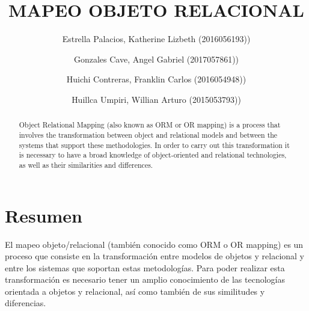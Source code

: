 \documentclass[preprint,12pt]{elsarticle}
\begin{document}
	
	\begin{frontmatter} 

		\title{\huge MAPEO OBJETO RELACIONAL}
		
		\author{Estrella Palacios, Katherine Lizbeth              	(2016056193))}
		\author{Gonzales Cave, Angel Gabriel              	(2017057861))}
		\author{Huichi Contreras, Franklin Carlos         	(2016054948))} 
		\author{Huillca Umpiri, Willian Arturo             		(2015053793))} 
		\address{Escuela Profesional de Ingeniería de Sistemas}
		\address{Universidad Privada de Tacna}
		\address{Tacna, Perú}
		

		\begin{abstract}
		
Object Relational Mapping (also known as ORM or OR mapping) is a process that involves the transformation between object and relational models and between the systems that support these methodologies.
In order to carry out this transformation it is necessary to have a broad knowledge of object-oriented and relational technologies, as well as their similarities and differences.

		\end{abstract}


	\end{frontmatter}


\section{Resumen}

El mapeo objeto/relacional (también conocido como ORM o OR mapping) es un proceso que consiste en la transformación entre modelos de objetos y relacional y entre los sistemas que soportan estas metodologías.
Para poder realizar esta transformación es necesario tener un amplio conocimiento de las tecnologías orientada a objetos y relacional, así como también de sus similitudes y diferencias.

\end{document}
